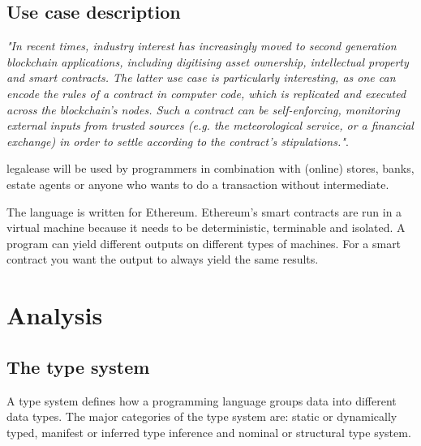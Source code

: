 \documentclass{uva-inf-article}
\begin{document}
\subsection{Use case description}
\textit{"In recent times, industry interest has increasingly moved to second generation blockchain applications, 
including digitising asset ownership, intellectual property and smart contracts. The latter use case is particularly interesting, 
as one can encode the rules of a contract in computer code, which is replicated and executed across the blockchain’s nodes. 
Such a contract can be self-enforcing, monitoring external inputs from trusted sources (e.g. the meteorological service, or a financial exchange) in 
order to settle according to the contract’s stipulations."}\cite{Peters2016}.
\vspace{5mm}

\par legalease will be used by programmers in combination with (online) stores, banks, estate agents or anyone 
who wants to do a transaction without intermediate.
\vspace{5mm}

\par The language is written for Ethereum. Ethereum's smart contracts are run in a virtual machine because 
it needs to be deterministic, terminable and isolated.
A program can yield different outputs on different types of machines.
For a smart contract you want the output to always yield the same results.

\newpage
\section{Analysis}
\subsection{The type system}
\par A type system defines how a programming language groups data into different data types.
The major categories of the type system are: static or dynamically typed, manifest or inferred 
type inference and nominal or structural type system.
\vspace{5mm}
\end{document}
